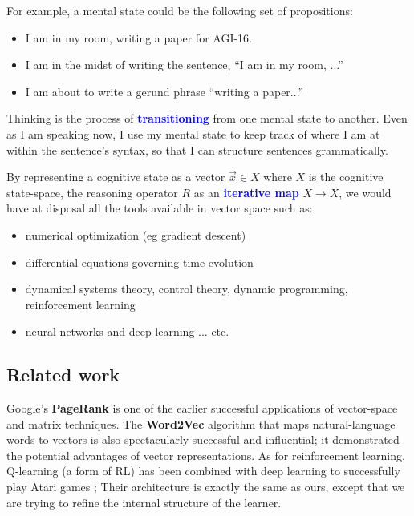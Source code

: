 \documentclass[orivec]{llncs}
\newcommand{\emp}[1]{\textbf{\textcolor{blue}{#1}}}
\begin{document}
For example, a mental state could be the following set of propositions:
\begin{itemize}
\item I am in my room, writing a paper for AGI-16.
\item I am in the midst of writing the sentence, ``I am in my room, ...''
\item I am about to write a gerund phrase ``writing a paper...''
\end{itemize}

Thinking is the process of \emp{transitioning} from one mental state to another.  Even as I am speaking now, I use my mental state to keep track of where I am at within the sentence's syntax, so that I can structure sentences grammatically.

By representing a cognitive state as a vector $\vec{x} \in X$ where $X$ is the cognitive state-space, the reasoning operator $R$ as an \emp{iterative map} $X \rightarrow X$, we would have at disposal all the tools available in vector space such as:

\begin{itemize}
\item numerical optimization (eg gradient descent)
\item differential equations governing time evolution
\item dynamical systems theory, control theory, dynamic programming, reinforcement learning
\item neural networks and deep learning ... etc.
\end{itemize}

\subsection{Related work}

Google's \textbf{PageRank} is one of the earlier successful applications of vector-space and matrix techniques.  The \textbf{Word2Vec} \cite{Weston2015} algorithm that maps natural-language words to vectors is also spectacularly successful and influential;  it demonstrated the potential advantages of vector representations.  As for reinforcement learning, Q-learning (a form of RL) has been combined with deep learning to successfully play Atari games \cite{Mnih2013};  Their architecture is exactly the same as ours, except that we are trying to refine the internal structure of the learner.
\end{document}
